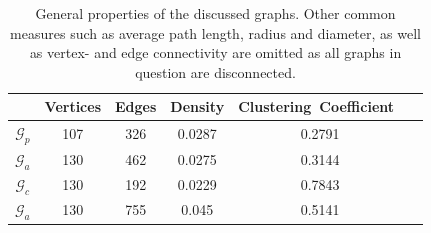 \documentclass[11pt,a4paper]{book}
\theoremstyle{definition}
\theoremstyle{definition}
\theoremstyle{definition}
\theoremstyle{remark}
\newcommand{\pgraph}{\mathcal{G}_{p}}
\newcommand{\agraph}{\mathcal{G}_{a}}
\newcommand{\cgraph}{\mathcal{G}_{c}}
\begin{document}
\begin{center}
\begin{table}
\small
\centering
\begin{tabular}{c| c c c c c}
\toprule
{} &  Vertices & Edges  &  Density & Clustering\ Coefficient\ \\
\midrule
$\pgraph$ & 107  & 326 &  0.0287 &  0.2791 \\
$\agraph$  & 130  & 462 &   0.0275 &  0.3144 \\
$\cgraph$  & 130  & 192 &  0.0229 &  0.7843 \\
$\agraph$  & 130  & 755 & 0.045 &  0.5141 \\
\bottomrule
\end{tabular}
\caption{General properties of the discussed graphs. Other common measures such as average path length, radius and diameter, as well as vertex- and edge connectivity are omitted as all graphs in question are disconnected.} 
\label{tab:graph-stat}
\end{table}
\end{center}
\end{document}
